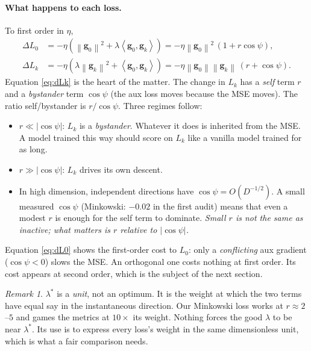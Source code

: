 \documentclass[11pt,a4paper]{article}
\theoremstyle{definition}
\theoremstyle{remark}
\newtheorem*{remark}{Remark}
\newcommand{\norm}[1]{\left\lVert #1 \right\rVert}
\newcommand{\ip}[2]{\left\langle #1, #2 \right\rangle}
\newcommand{\g}{\bm{g}}
\begin{document}
\paragraph{What happens to each loss.}
To first order in $\eta$,
\begin{align}
  \Delta L_0 &= -\eta\left(\norm{\g_0}^2 + \lambda\ip{\g_0}{\g_k}\right)
             = -\eta\norm{\g_0}^2\,(1 + r\cos\psi), \label{eq:dL0}\\
  \Delta L_k &= -\eta\left(\lambda\norm{\g_k}^2 + \ip{\g_0}{\g_k}\right)
             = -\eta\norm{\g_0}\norm{\g_k}\,(r + \cos\psi). \label{eq:dLk}
\end{align}
Equation \eqref{eq:dLk} is the heart of the matter. The change in $L_k$ has a \emph{self}
term $r$ and a \emph{bystander} term $\cos\psi$ (the aux loss moves because the MSE moves).
The ratio self/bystander is $r/\cos\psi$. Three regimes follow:
\begin{itemize}[nosep]
\item $r\ll|\cos\psi|$: $L_k$ is a \emph{bystander}. Whatever it does is inherited from the
  MSE. A model trained this way should score on $L_k$ like a vanilla model trained for as
  long.
\item $r\gg|\cos\psi|$: $L_k$ drives its own descent.
\item In high dimension, independent directions have $\cos\psi = O(D^{-1/2})$. A small
  measured $\cos\psi$ (Minkowski: $-0.02$ in the first audit) means that even a modest $r$
  is enough for the self term to dominate. \emph{Small $r$ is not the same as inactive;
  what matters is $r$ relative to $|\cos\psi|$.}
\end{itemize}
Equation \eqref{eq:dL0} shows the first-order cost to $L_0$: only a \emph{conflicting}
aux gradient ($\cos\psi<0$) slows the MSE. An orthogonal one costs nothing at first order.
Its cost appears at second order, which is the subject of the next section.

\begin{remark}
$\lambda^*$ is a \emph{unit}, not an optimum. It is the weight at which the two terms have
equal say in the instantaneous direction. Our Minkowski loss works at $r\approx 2$--$5$ and
games the metrics at $10\times$ its weight. Nothing forces the good $\lambda$ to be near
$\lambda^*$. Its use is to express every loss's weight in the same dimensionless unit, which
is what a fair comparison needs.
\end{remark}

\end{document}
